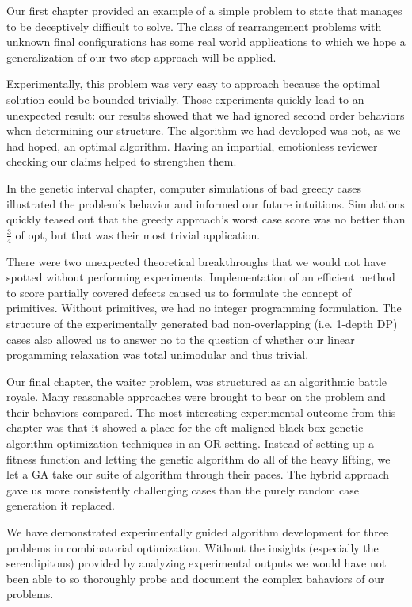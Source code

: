 \documentclass[11pt]{article}
\begin{document}
Our first chapter provided an example of a simple problem to state that manages to be deceptively difficult to solve. The class of rearrangement problems with unknown final configurations has some real world applications to which we hope a generalization of our two step approach will be applied.  

Experimentally, this problem was very easy to approach because the optimal solution could be bounded trivially.  Those experiments quickly lead to an unexpected result: our results showed that we had ignored second order behaviors when determining our structure.  The algorithm we had developed was not, as we had hoped, an optimal algorithm. Having an impartial, emotionless reviewer checking our claims helped to strengthen them.

In the genetic interval chapter, computer simulations of bad greedy cases illustrated the problem’s behavior and informed our future intuitions. Simulations quickly teased out that the greedy approach’s worst case score was no better than $\frac34$ of opt, but that was their most trivial application.

There were two unexpected theoretical breakthroughs that we would not have spotted without performing experiments. Implementation of an efficient method to score partially covered defects caused us to formulate the concept of primitives. Without primitives, we had no integer programming formulation. The structure of the experimentally generated bad non-overlapping (i.e. 1-depth DP) cases also allowed us to answer no to the question of whether our linear progamming relaxation was total unimodular and thus trivial.

Our final chapter, the waiter problem, was structured as an algorithmic battle royale. Many reasonable approaches were brought to bear on the problem and their behaviors compared.  The most interesting experimental outcome from this chapter was that it showed a place for the oft maligned black-box genetic algorithm optimization techniques in an OR setting.  Instead of setting up a fitness function and letting the genetic algorithm do all of the heavy lifting, we let a GA take our suite of algorithm through their paces.  The hybrid approach gave us more consistently challenging cases than the purely random case generation it replaced.

We have demonstrated experimentally guided algorithm development for three problems in combinatorial optimization.  Without the insights (especially the serendipitous) provided by analyzing experimental outputs we would have not been able to so thoroughly probe and document the complex bahaviors of our problems.
\end{document}
